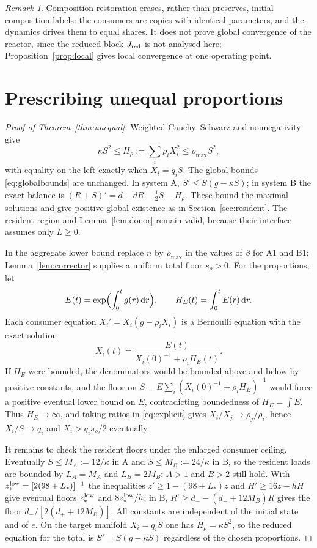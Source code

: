 \documentclass[11pt,a4paper]{article}
\theoremstyle{plain}
\theoremstyle{definition}
\theoremstyle{remark}
\newtheorem{remark}[theorem]{Remark}
\newcommand{\dd}{\mathrm d}
\begin{document}
\begin{remark}
Composition restoration erases, rather than preserves, initial composition labels: the consumers are copies with identical parameters, and the dynamics drives them to equal shares. It does not prove global convergence of the reactor, since the reduced block $J_{\rm red}$ is not analysed here; Proposition~\ref{prop:local} gives local convergence at one operating point.
\end{remark}

\section{Prescribing unequal proportions}\label{sec:unequal}
\begin{proof}[Proof of Theorem~\ref{thm:unequal}]
Weighted Cauchy--Schwarz and nonnegativity give
\begin{equation}\label{eq:weighted}
\kappa S^2\le H_\rho:=\sum_i\rho_iX_i^2\le\rho_{\max}S^2,
\end{equation}
with equality on the left exactly when $X_i=q_iS$. The global bounds \eqref{eq:globalbounds} are unchanged. In system A, $S'\le S(g-\kappa S)$; in system B the exact balance is $(R+S)'=d-dR-\tfrac12S-H_\rho$. These bound the maximal solutions and give positive global existence as in Section~\ref{sec:resident}. The resident region and Lemma~\ref{lem:donor} remain valid, because their interface assumes only $L\ge0$.

In the aggregate lower bound replace $n$ by $\rho_{\max}$ in the values of $\beta$ for A1 and B1; Lemma~\ref{lem:corrector} supplies a uniform total floor $s_\rho>0$. For the proportions, let
\[
E(t)=\exp\Bigl(\int_0^tg(r)\,\dd r\Bigr),\qquad H_E(t)=\int_0^tE(r)\,\dd r .
\]
Each consumer equation $X_i'=X_i(g-\rho_iX_i)$ is a Bernoulli equation with the exact solution
\begin{equation}\label{eq:explicit}
X_i(t)=\frac{E(t)}{X_i(0)^{-1}+\rho_iH_E(t)} .
\end{equation}
If $H_E$ were bounded, the denominators would be bounded above and below by positive constants, and the floor on $S=E\sum_i(X_i(0)^{-1}+\rho_iH_E)^{-1}$ would force a positive eventual lower bound on $E$, contradicting boundedness of $H_E=\int E$. Thus $H_E\to\infty$, and taking ratios in \eqref{eq:explicit} gives $X_i/X_j\to\rho_j/\rho_i$, hence $X_i/S\to q_i$ and $X_i>q_is_\rho/2$ eventually.

It remains to check the resident floors under the enlarged consumer ceiling. Eventually $S\le M_A:=12/\kappa$ in A and $S\le M_B:=24/\kappa$ in B, so the resident loads are bounded by $L_A=M_A$ and $L_B=2M_B$; $A>1$ and $B>2$ still hold. With $z_*^{\rm low}=[2(98+L_*)]^{-1}$ the inequalities $z'\ge1-(98+L_*)z$ and $H'\ge16z-hH$ give eventual floors $z_*^{\rm low}$ and $8z_*^{\rm low}/h$; in B, $R'\ge d_--(d_++12M_B)R$ gives the floor $d_-/[2(d_++12M_B)]$. All constants are independent of the initial state and of $e$. On the target manifold $X_i=q_iS$ one has $H_\rho=\kappa S^2$, so the reduced equation for the total is $S'=S(g-\kappa S)$ regardless of the chosen proportions.
\end{proof}
\end{document}
